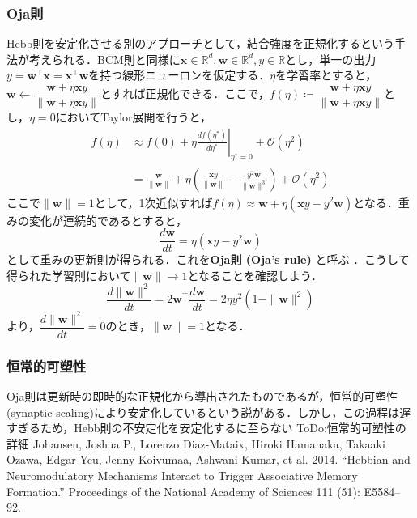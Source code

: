 \subsubsection{Oja則}
Hebb則を安定化させる別のアプローチとして，結合強度を正規化するという手法が考えられる．BCM則と同様に$\mathbf{x}\in \mathbb{R}^d, \mathbf{w}\in \mathbb{R}^d, y\in \mathbb{R}$とし，単一の出力$y = \mathbf{w}^\top \mathbf{x}=\mathbf{x}^\top \mathbf{w}$を持つ線形ニューロンを仮定する．$\eta$を学習率とすると，$\mathbf{w}\leftarrow\dfrac{\mathbf{w}+\eta \mathbf{x}y}{\|\mathbf{w}+\eta \mathbf{x}y\|}$とすれば正規化できる．ここで，$f(\eta)\coloneqq \dfrac{\mathbf{w}+\eta \mathbf{x}y}{\|\mathbf{w}+\eta \mathbf{x}y\|}$とし，$\eta=0$においてTaylor展開を行うと，
\begin{align}
f(\eta)&\approx f(0) + \eta \left.\frac{df(\eta^*)}{d\eta^*}\right|_{\eta^*=0} + \mathcal{O}(\eta^2)\\
&=\frac{\mathbf{w}}{\|\mathbf{w}\|} + \eta \left(\frac{\mathbf{x}y}{\|\mathbf{w}\|}-\frac{y^2\mathbf{w}}{\|\mathbf{w}\|^3}\right)+ \mathcal{O}(\eta^2)
\end{align}
ここで$\|\mathbf{w}\|=1$として，1次近似すれば$f(\eta)\approx \mathbf{w} + \eta \left(\mathbf{x}y-y^2 \mathbf{w}\right)$となる．重みの変化が連続的であるとすると，
\begin{equation}
\frac{d\mathbf{w}}{dt} = \eta \left(\mathbf{x}y-y^2 \mathbf{w}\right)
\end{equation}
として重みの更新則が得られる．これを\textbf{Oja則 (Oja's rule)} と呼ぶ \citep{Oja1982-yd}．こうして得られた学習則において$\|\mathbf{w}\|\to 1$となることを確認しよう．
\begin{equation}
\frac{d\|\mathbf{w}\|^2}{dt}=2\mathbf{w}^\top\frac{d\mathbf{w}}{dt}= 2\eta y^2\left(1-\|\mathbf{w}\|^2\right)
\end{equation}
より，$\dfrac{d\|\mathbf{w}\|^2}{dt}=0$のとき，$\|\mathbf{w}\|= 1$となる．
\subsubsection{恒常的可塑性}
Oja則は更新時の即時的な正規化から導出されたものであるが，恒常的可塑性 (synaptic scaling)により安定化しているという説がある\citep{Turrigiano2008-lm}\citep{Yee2017-fb}．しかし，この過程は遅すぎるため，Hebb則の不安定化を安定化するに至らない\citep{Zenke2017-el}
ToDo:恒常的可塑性の詳細
Johansen, Joshua P., Lorenzo Diaz-Mataix, Hiroki Hamanaka, Takaaki Ozawa, Edgar Ycu, Jenny Koivumaa, Ashwani Kumar, et al. 2014. “Hebbian and Neuromodulatory Mechanisms Interact to Trigger Associative Memory Formation.” Proceedings of the National Academy of Sciences 111 (51): E5584–92.
